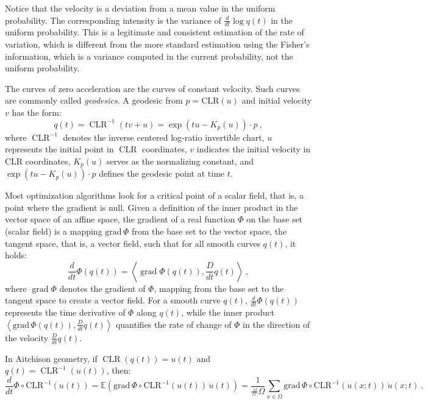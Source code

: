 \documentclass[axioms,article,submit,pdftex,moreauthors]{Definitions/mdpi}
\theoremstyle{plain}
\theoremstyle{remark}
\newcommand{\CLR}{\operatorname{CLR}}
\newcommand{\Grad}{\operatorname{grad}}
\begin{document}
Notice that the velocity is a deviation from a mean value in the uniform probability. The corresponding intensity is the variance of $\frac{d}{dt} \log q(t)$ in the uniform probability. This is a legitimate and consistent estimation of the rate of variation, which is different from the more standard estimation using the Fisher's information, which is a variance computed in the current probability, not the uniform probability.

The curves of zero acceleration are the curves of constant velocity. Such curves are commonly called \emph{geodesics}. A geodesic from $p = \text{CLR}(u)$ and initial velocity $v$ has the form:
\begin{equation*} 
q(t) = \CLR^{-1}(tv + u) = \exp(tu - K_p(u)) \cdot p \ ,
\end{equation*} 
where \(\CLR^{-1}\) denotes the inverse centered log-ratio invertible chart, \(u\) represents the initial point in $\CLR$ coordinates, \(v\) indicates the initial velocity in CLR coordinates, \(K_p(u)\) serves as the normalizing constant, and \(\exp(tu - K_p(u)) \cdot p\) defines the geodesic point at time \(t\).

Most optimization algorithms look for a critical point of a scalar field, that is, a point where the gradient is null. Given a definition of the inner product in the vector space of an affine space, the gradient of a real function $\Phi$ on the base set (scalar field) is a mapping $\text{grad} \, \Phi$ from the base set to the vector space, the tangent space, that is, a vector field, such that for all smooth curves $q(t)$, it holds:
\begin{equation*} 
\frac{d}{dt} \Phi(q(t)) = \left\langle \Grad\Phi(q(t)), \frac{D}{dt} q(t) \right\rangle  \ ,
\end{equation*} 
where \(\Grad\Phi\) denotes the gradient of \(\Phi\), mapping from the base set to the tangent space to create a vector field. For a smooth curve \(q(t)\), \(\frac{d}{dt} \Phi(q(t))\) represents the time derivative of \(\Phi\) along \(q(t)\), while the inner product \(\left\langle \text{grad} \, \Phi(q(t)), \frac{D}{dt} q(t) \right\rangle\) quantifies the rate of change of \(\Phi\) in the direction of the velocity \(\frac{D}{dt} q(t)\).

In Aitchison geometry, if $\CLR(q(t)) = u(t)$ and $q(t) = \CLR^{-1}(u(t))$, then:
\begin{equation*} 
\frac{d}{dt} \Phi \circ \text{CLR}^{-1}(u(t)) = \mathbb{E} \left( \text{grad} \, \Phi \circ \text{CLR}^{-1}(u(t)) \, \dot{u}(t) \right) = \frac{1}{\#\Omega} \sum_{x \in \Omega} \text{grad} \, \Phi \circ \text{CLR}^{-1}(u(x; t)) \, \dot{u}(x; t) \ .
\end{equation*} 
\end{document}
